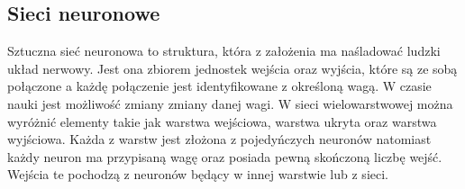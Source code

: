 \documentclass{classrep}
\begin{document}
    {
        \subsection{Sieci neuronowe}
        {
            Sztuczna sieć neuronowa to struktura, która z założenia ma naśladować ludzki
            układ nerwowy. Jest ona zbiorem jednostek wejścia oraz wyjścia, które są ze
            sobą połączone a każdę połączenie jest identyfikowane z określoną wagą.
            W czasie nauki jest możliwość zmiany zmiany danej wagi. W sieci wielowarstwowej
            można wyróżnić elementy takie jak warstwa wejściowa, warstwa ukryta oraz warstwa
            wyjściowa. Każda z warstw jest złożona z pojedyńczych neuronów natomiast każdy
            neuron ma przypisaną wagę oraz posiada pewną skończoną liczbę wejść. Wejścia te
            pochodzą z neuronów będący w innej warstwie lub z sieci.
        }
}
\end{document}
